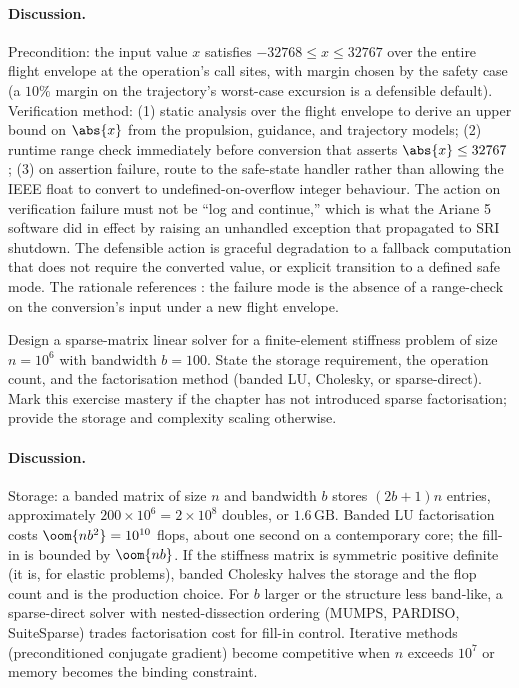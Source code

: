 \paragraph{Discussion.}
Precondition: the input value $x$ satisfies $-32768 \leq x \leq
32767$ over the entire flight envelope at the operation's call
sites, with margin chosen by the safety case (a $10\%$ margin on
the trajectory's worst-case excursion is a defensible default).
Verification method: (1) static analysis over the flight envelope
to derive an upper bound on $\abs{x}$ from the propulsion,
guidance, and trajectory models; (2) runtime range check
immediately before conversion that asserts $\abs{x} \leq 32767$;
(3) on assertion failure, route to the safe-state handler rather
than allowing the IEEE float to convert to undefined-on-overflow
integer behaviour. The action on verification failure must not be
``log and continue,'' which is what the Ariane 5 software did in
effect by raising an unhandled exception that propagated to SRI
shutdown. The defensible action is graceful degradation to a
fallback computation that does not require the converted value, or
explicit transition to a defined safe mode. The rationale references
\cite{acc:ariane501-ifr}: the failure mode is the absence of a
range-check on the conversion's input under a new flight envelope.

\begin{exercise}
Design a sparse-matrix linear solver for a finite-element
stiffness problem of size $n = 10^{6}$ with bandwidth $b = 100$.
State the storage requirement, the operation count, and the
factorisation method (banded LU, Cholesky, or sparse-direct). Mark
this exercise mastery if the chapter has not introduced sparse
factorisation; provide the storage and complexity scaling
otherwise.
\end{exercise}

\paragraph{Discussion.}
Storage: a banded matrix of size $n$ and bandwidth $b$ stores
$(2 b + 1) n$ entries, approximately $200 \times 10^{6} = 2
\times 10^{8}$ doubles, or $1.6 \,\text{GB}$. Banded LU
factorisation costs $\oom{n b^{2}} = 10^{10}$ flops, about one
second on a contemporary core; the fill-in is bounded by
$\oom{n b}$. If the stiffness matrix is symmetric positive
definite (it is, for elastic problems), banded Cholesky halves
the storage and the flop count and is the production choice. For
$b$ larger or the structure less band-like, a sparse-direct
solver with nested-dissection ordering (MUMPS, PARDISO, SuiteSparse)
trades factorisation cost for fill-in control. Iterative methods
(preconditioned conjugate gradient) become competitive when $n$
exceeds $10^{7}$ or memory becomes the binding constraint.

